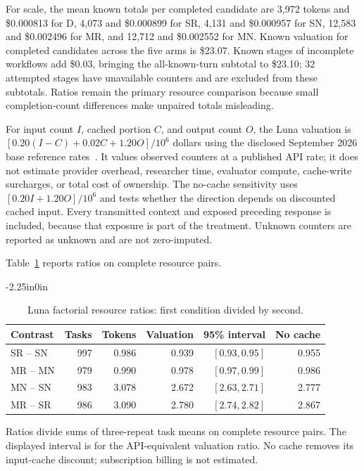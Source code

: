 \documentclass[10pt,letterpaper]{article}
\begin{document}
For scale, the mean known totals per completed candidate are 3,972 tokens and \$0.000813 for D, 4,073 and \$0.000899 for SR, 4,131 and \$0.000957 for SN, 12,583 and \$0.002496 for MR, and 12,712 and \$0.002552 for MN. Known valuation for completed candidates across the five arms is \$23.07. Known stages of incomplete workflows add \$0.03, bringing the all-known-turn subtotal to \$23.10; 32 attempted stages have unavailable counters and are excluded from these subtotals. Ratios remain the primary resource comparison because small completion-count differences make unpaired totals misleading.

For input count $I$, cached portion $C$, and output count $O$, the Luna valuation is $[0.20(I-C)+0.02C+1.20O]/10^6$ dollars using the disclosed September 2026 base reference rates~\cite{openai56luna2026,openaipricing2026}. It values observed counters at a published API rate; it does not estimate provider overhead, researcher time, evaluator compute, cache-write surcharges, or total cost of ownership. The no-cache sensitivity uses $[0.20I+1.20O]/10^6$ and tests whether the direction depends on discounted cached input. Every transmitted context and exposed preceding response is included, because that exposure is part of the treatment. Unknown counters are reported as unknown and are not zero-imputed.

Table~\ref{tab:scale-resources} reports ratios on complete resource pairs.

\FloatBarrier
\begin{table}[!ht]
\begin{adjustwidth}{-2.25in}{0in}\centering
\caption{Luna factorial resource ratios: first condition divided by second.}
\label{tab:scale-resources}
\begin{tabular}{lrrrrr}\toprule
Contrast & Tasks & Tokens & Valuation & 95\% interval & No cache\\\midrule
SR -- SN & 997 & 0.986 & 0.939 & $[0.93, 0.95]$ & 0.955\\
MR -- MN & 979 & 0.990 & 0.978 & $[0.97, 0.99]$ & 0.986\\
MN -- SN & 983 & 3.078 & 2.672 & $[2.63, 2.71]$ & 2.777\\
MR -- SR & 986 & 3.090 & 2.780 & $[2.74, 2.82]$ & 2.867\\
\bottomrule\end{tabular}
\par\smallskip\noindent Ratios divide sums of three-repeat task means on complete resource pairs. The displayed interval is for the API-equivalent valuation ratio. No cache removes its input-cache discount; subscription billing is not estimated.
\end{adjustwidth}
\end{table}
\FloatBarrier
\end{document}

